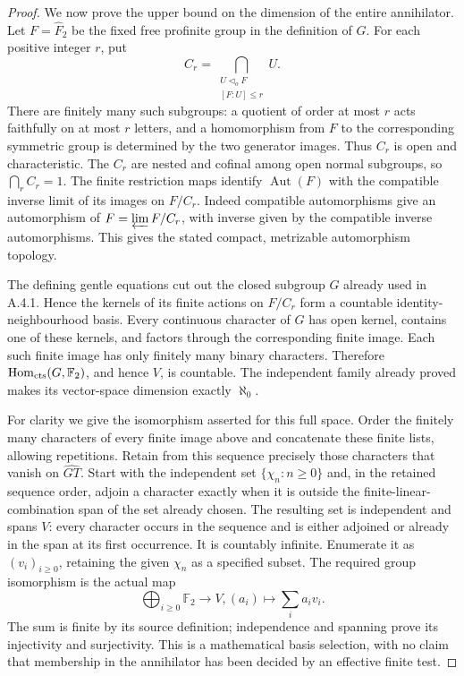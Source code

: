 \begin{proof}
We now prove the upper bound on the dimension of the entire
annihilator.  Let $F=\widehat F_2$ be the fixed free profinite
group in the definition of $G$.  For each positive integer
$r$, put
\[
 C_r=\bigcap_{\substack{U\triangleleft_o F\\{}[F:U]\le r}}U.
                                                        \tag{B.I10}
\]
There are finitely many such subgroups: a quotient of order
at most $r$ acts faithfully on at most $r$ letters, and a
homomorphism from $F$ to the corresponding symmetric group
is determined by the two generator images.  Thus $C_r$ is
open and characteristic.  The $C_r$ are nested and cofinal
among open normal subgroups, so $\bigcap_rC_r=1$.
The finite restriction maps identify
$\operatorname{Aut}(F)$ with the compatible inverse limit
of its images on $F/C_r$.  Indeed compatible automorphisms
give an automorphism of $F=\varprojlim F/C_r$, with inverse
given by the compatible inverse automorphisms.  This gives
the stated compact, metrizable automorphism topology.

The defining gentle equations cut out the closed subgroup
$G$ already used in A.4.1.  Hence the kernels of its finite
actions on $F/C_r$ form a countable identity-neighbourhood
basis.  Every continuous character of $G$ has open kernel,
contains one of these kernels, and factors through the
corresponding finite image.  Each such finite image has
only finitely many binary characters.  Therefore
$\operatorname{Hom}_{\rm cts}(G,\mathbb F_2)$, and hence
$V$, is countable.  The independent family already proved
makes its vector-space dimension exactly $\aleph_0$.

For clarity we give the isomorphism asserted for this full
space.  Order the finitely many characters of every finite
image above and concatenate these finite lists, allowing
repetitions.  Retain from this sequence precisely those
characters that vanish on $\widehat{GT}$.  Start with the
independent set $\{\chi_n:n\ge0\}$ and, in the retained
sequence order, adjoin a character exactly when it is
outside the finite-linear-combination span of the set
already chosen.  The resulting set is independent and
spans $V$: every character occurs in the sequence and is
either adjoined or already in the span at its first
occurrence.  It is countably infinite.  Enumerate it as
$(v_i)_{i\ge0}$, retaining the given $\chi_n$ as a specified
subset.  The required group isomorphism is the actual map
\[
 \bigoplus_{i\ge0}\mathbb F_2\longrightarrow V,
       (a_i)\longmapsto\sum_i a_i v_i.
                                                        \tag{B.I11}
\]
The sum is finite by its source definition; independence
and spanning prove its injectivity and surjectivity.
This is a mathematical basis selection, with no claim
that membership in the annihilator has been decided by
an effective finite test.


\end{proof}
